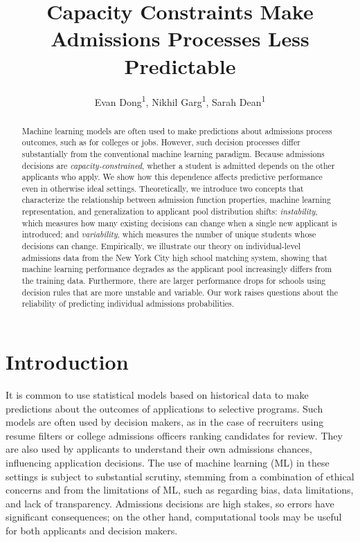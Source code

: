 \documentclass[letterpaper]{article}
\title{Capacity Constraints Make Admissions Processes Less Predictable}
\author {
    Evan Dong\textsuperscript{\rm 1},
    Nikhil Garg\textsuperscript{\rm 1},
    Sarah Dean\textsuperscript{\rm 1}
}
\begin{document}
\maketitle

\begin{abstract}
Machine learning models are often used to make predictions about admissions process outcomes, such as for colleges or jobs.  However, such decision processes differ substantially from the conventional machine learning paradigm. Because admissions decisions are \textit{capacity-constrained}, whether a student is admitted depends on the other applicants who apply. We show how this dependence affects predictive performance even in otherwise ideal settings. Theoretically, we introduce two concepts that characterize the relationship between admission function properties, machine learning representation, and generalization to applicant pool distribution shifts: \textit{instability}, which measures how many existing decisions can change when a single new applicant is introduced; and \textit{variability}, which measures the number of unique students whose decisions can change. Empirically, we illustrate our theory on individual-level admissions data from the New York City high school matching system, showing that machine learning performance degrades as the applicant pool increasingly differs from the training data. Furthermore, there are larger performance drops for schools using decision rules that are more unstable and variable. Our work raises questions about the reliability of predicting individual admissions probabilities.
\end{abstract}

\section{Introduction}

It is common to use statistical models based on historical data to make predictions about the outcomes of applications to selective programs.
Such models are often used by decision makers, as in the case of recruiters using resume filters or college admissions officers ranking candidates for review.
They are also used by applicants to understand their own admissions chances, influencing application decisions.
The use of machine learning (ML) in these settings is subject to substantial scrutiny, stemming from a combination of ethical concerns and from the limitations of ML, such as regarding bias, data limitations, and lack of transparency.
Admissions decisions are high stakes, so errors have significant consequences; on the other hand, computational tools may be useful for both applicants and decision makers.
\end{document}
